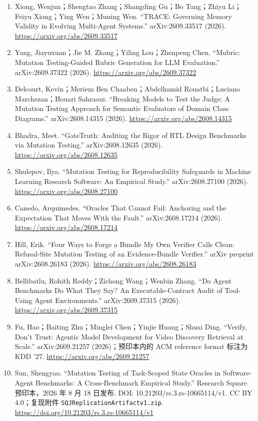 \documentclass[UTF8,11pt]{ctexart}
\begin{document}
\begin{enumerate}[leftmargin=*,nosep]
\item Xiong, Wenjun；Shengtao Zhang；Shangding Gu；Bo Tang；Zhiyu Li；Feiyu Xiong；Ying Wen；Muning Wen. ``TRACE: Governing Memory Validity in Evolving Multi-Agent Systems.'' arXiv:2609.33517 (2026). \url{https://arxiv.org/abs/2609.33517}
\item Yang, Jiayuxuan；Jie M. Zhang；Yiling Lou；Zhenpeng Chen. ``Mubric: Mutation Testing-Guided Rubric Generation for LLM Evaluation.'' arXiv:2609.37322 (2026). \url{https://arxiv.org/abs/2609.37322}
\item Delcourt, Kevin；Meriem Ben Chaaben；Abdelhamid Rouatbi；Luciano Marchezan；Houari Sahraoui. ``Breaking Models to Test the Judge: A Mutation Testing Approach for Semantic Evaluators of Domain Class Diagrams.'' arXiv:2608.14315 (2026). \url{https://arxiv.org/abs/2608.14315}
\item Bhadra, Meet. ``GateTruth: Auditing the Rigor of RTL Design Benchmarks via Mutation Testing.'' arXiv:2608.12635 (2026). \url{https://arxiv.org/abs/2608.12635}
\item Shulepov, Ilya. ``Mutation Testing for Reproducibility Safeguards in Machine Learning Research Software: An Empirical Study.'' arXiv:2608.27100 (2026). \url{https://arxiv.org/abs/2608.27100}
\item Canedo, Arquimedes. ``Oracles That Cannot Fail: Anchoring and the Expectation That Moves With the Fault.'' arXiv:2608.17214 (2026). \url{https://arxiv.org/abs/2608.17214}
\item Hill, Erik. ``Four Ways to Forge a Bundle My Own Verifier Calls Clean: Refusal-Site Mutation Testing of an Evidence-Bundle Verifier.'' arXiv preprint arXiv:2608.26183 (2026). \url{https://arxiv.org/abs/2608.26183}
\item Bellibatlu, Rohith Reddy；Zichong Wang；Wenbin Zhang. ``Do Agent Benchmarks Do What They Say? An Executable-Contract Audit of Tool-Using Agent Environments.'' arXiv:2609.37315 (2026). \url{https://arxiv.org/abs/2609.37315}
\item Fu, Hao；Baiting Zhu；Minglei Chen；Yinjie Huang；Shuai Ding. ``Verify, Don't Trust: Agentic Model Development for Video Discovery Retrieval at Scale.'' arXiv:2609.21257 (2026)；预印本内的 ACM reference format 标注为 KDD '27. \url{https://arxiv.org/abs/2609.21257}
\item Sun, Shengyao. ``Mutation Testing of Task-Scoped State Oracles in Software-Agent Benchmarks: A Cross-Benchmark Empirical Study.'' Research Square 预印本，2026 年 8 月 18 日发布. DOI: 10.21203/rs.3.rs-10665114/v1. CC BY 4.0；复现附件 \texttt{SQJReplicationArtifactv1.zip}. \url{https://doi.org/10.21203/rs.3.rs-10665114/v1}

\end{enumerate}
\end{document}

